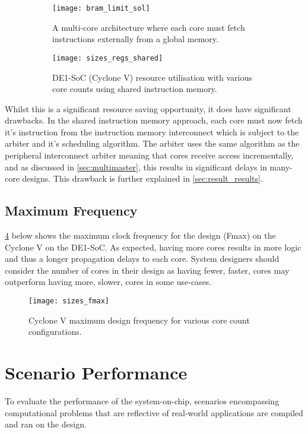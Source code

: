 \begin{figure}[H]
\begin{subfigure}{.5\textwidth}
  \centering
  \texttt{[image: bram\_limit\_sol]}
  \caption{A multi-core architecture where each core must fetch instructions externally from a global memory.}
  \label{fig:bram_limit_sola}
\end{subfigure}%
\begin{subfigure}{.5\textwidth}
  \centering
  \texttt{[image: sizes\_regs\_shared]}
  \caption{DE1-SoC (Cyclone V) resource utilisation with various core counts using shared instruction memory.}
  \label{fig:bram_limit_solb}
\end{subfigure}
\caption{}
\label{fig:bram_limit_sol}
\end{figure}

Whilst this is a significant resource saving opportunity, it does have significant drawbacks. In the shared instruction memory approach, each core must now fetch it's instruction from the instruction memory interconnect which is subject to the arbiter and it's scheduling algorithm. The arbiter uses the same algorithm as the peripheral interconnect arbiter meaning that cores receive access incrementally, and as discussed in \cref{sec:multimaster}, this results in significant delays in many-core designs. This drawback is further explained in \cref{sec:result_results}.



\subsection{Maximum Frequency}
\cref{fig:sizes_fmax} below shows the maximum clock frequency for the design (Fmax) on the Cyclone V on the DE1-SoC. As expected, having more cores results in more logic and thus a longer  propagation delays to each core. System designers should consider the number of cores in their design as having fewer, faster, cores may outperform having more, slower, cores in some use-cases.

\begin{figure}[h]
\centering
\texttt{[image: sizes\_fmax]}
\caption{Cyclone V maximum design frequency for various core count configurations.}
\label{fig:sizes_fmax}
\end{figure}

\section{Scenario Performance}
To evaluate the performance of the system-on-chip, scenarios encompassing computational problems that are reflective of real-world applications are compiled and ran on the design.

